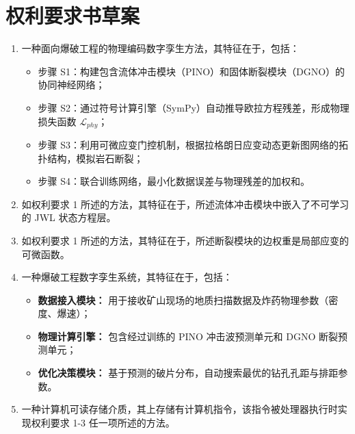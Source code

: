 \documentclass[a4paper,12pt]{article}
\begin{document}
\section{权利要求书草案}

\begin{enumerate}
    \item 一种面向爆破工程的物理编码数字孪生方法，其特征在于，包括：
    \begin{itemize}
        \item 步骤 S1：构建包含流体冲击模块（PINO）和固体断裂模块（DGNO）的协同神经网络；
        \item 步骤 S2：通过符号计算引擎（SymPy）自动推导欧拉方程残差，形成物理损失函数 $\mathcal{L}_{phy}$；
        \item 步骤 S3：利用可微应变门控机制，根据拉格朗日应变动态更新图网络的拓扑结构，模拟岩石断裂；
        \item 步骤 S4：联合训练网络，最小化数据误差与物理残差的加权和。
    \end{itemize}
    \item 如权利要求 1 所述的方法，其特征在于，所述流体冲击模块中嵌入了不可学习的 JWL 状态方程层。
    \item 如权利要求 1 所述的方法，其特征在于，所述断裂模块的边权重是局部应变的可微函数。
    
    \item 一种爆破工程数字孪生系统，其特征在于，包括：
    \begin{itemize}
        \item \textbf{数据接入模块：} 用于接收矿山现场的地质扫描数据及炸药物理参数（密度、爆速）；
        \item \textbf{物理计算引擎：} 包含经过训练的 PINO 冲击波预测单元和 DGNO 断裂预测单元；
        \item \textbf{优化决策模块：} 基于预测的破片分布，自动搜索最优的钻孔孔距与排距参数。
    \end{itemize}
    
    \item 一种计算机可读存储介质，其上存储有计算机指令，该指令被处理器执行时实现权利要求 1-3 任一项所述的方法。
\end{enumerate}
\end{document}
